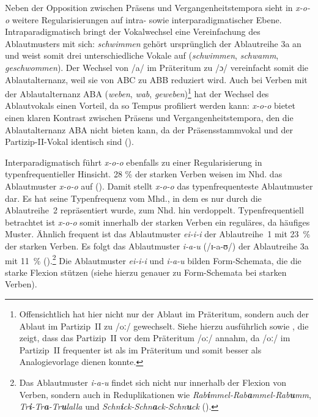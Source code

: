 Neben der Opposition zwischen Präsens und Vergangenheitstempora sieht \textcite[178--182]{Nowak.2013} in \textit{x-o-o} weitere Regularisierungen auf intra- sowie interparadigmatischer Ebene. Intraparadigmatisch bringt der Vokalwechsel eine Vereinfachung des Ablautmusters mit sich: \textit{schwimmen} gehört ursprünglich der Ablautreihe 3a an und weist somit drei unterschiedliche Vokale auf (\textit{schwimmen}, \textit{schwamm}, \textit{geschwommen}). Der Wechsel von /a/ im Präteritum zu /ɔ/ vereinfacht somit die Ablautalternanz, weil sie von ABC zu ABB reduziert wird. Auch bei Verben mit der Ablautalternanz ABA (\textit{weben}, \textit{wab}, \textit{geweben})\footnote{Offensichtlich hat hier nicht nur der Ablaut im Präteritum, sondern auch der Ablaut im Partizip~II zu /oː/ gewechselt. Siehe hierzu ausführlich \textcite[253]{Nowak.2015} sowie \textcite[166--167]{Nowak.2018}, die zeigt, dass das Partizip~II vor dem Präteritum /oː/ annahm, da /oː/ im Partizip~II frequenter ist als im Präteritum und somit besser als Analogievorlage dienen konnte.} hat der Wechsel des Ablautvokals einen Vorteil, da so Tempus profiliert werden kann: \textit{x-o-o} bietet einen klaren Kontrast zwischen Präsens und Vergangenheitstempora, den die Ablautalternanz ABA nicht bieten kann, da der Präsensstammvokal und der Partizip-II-Vokal identisch sind (\cite[179]{Nowak.2013}).\largerpage

 

Interparadigmatisch führt \textit{x-o-o} ebenfalls zu einer Regularisierung in typenfrequentieller Hinsicht. 28 \% der starken Verben weisen im Nhd. das Ablautmuster \textit{x-o-o} auf (\cite[181]{Nowak.2013}). Damit stellt \textit{x-o-o} das typenfrequenteste Ablautmuster dar. Es hat seine Typenfrequenz vom Mhd., in dem es nur durch die Ablautreihe~2 repräsentiert wurde, zum Nhd. hin verdoppelt. Typenfrequentiell betrachtet ist \textit{x-o-o} somit innerhalb der starken Verben ein reguläres, da häufiges Muster.  Ähnlich frequent ist das Ablautmuster \textit{ei-i-i} der Ablautreihe~1 mit 23~\% der starken Verben. Es folgt das Ablautmuster \textit{i-a-u} (/ɪ-a-ʊ/) der Ablautreihe 3a mit 11~\% (\cite[181]{Nowak.2013}).{\footnote{Das Ablautmuster \textit{i-a-u} findet sich nicht nur innerhalb der Flexion von Verben, sondern auch in Reduplikationen wie \textit{Rab\textbf{i}mmel-Rab\textbf{a}mmel-Rab\textbf{u}mm}, \textit{Tr\textbf{i}-Tr\textbf{a}-Tr\textbf{u}lalla} und \textit{Schn\textbf{i}ck-Schn\textbf{a}ck-Schn\textbf{u}ck} (\cite[269]{Nubling.2017}).}} Die Ablautmuster \textit{ei-i-i} und \textit{i-a-u} bilden Form-Schemata, die die starke Flexion stützen (siehe hierzu genauer  zu Form-Schemata bei starken Verben).



